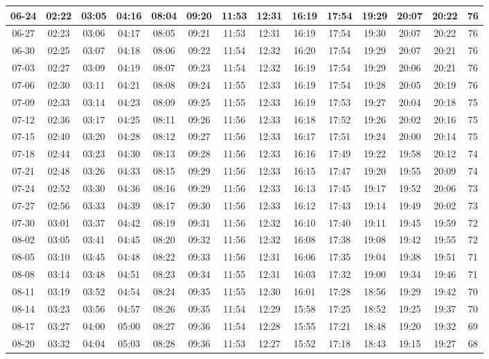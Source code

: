 \begin{footnotesize}
\begin{longtable}{c | c | c | c | c | c | c | c | c | c | c | c | c | c}
		06-24&02:22&03:05&04:16&08:04&09:20&11:53&12:31&16:19&17:54&19:29&20:07&20:22&76\\\hline
		06-27&02:23&03:06&04:17&08:05&09:21&11:53&12:31&16:19&17:54&19:30&20:07&20:22&76\\\hline
		06-30&02:25&03:07&04:18&08:06&09:22&11:54&12:32&16:20&17:54&19:29&20:07&20:21&76\\\hline
		07-03&02:27&03:09&04:19&08:07&09:23&11:54&12:32&16:19&17:54&19:29&20:06&20:21&76\\\hline
		07-06&02:30&03:11&04:21&08:08&09:24&11:55&12:33&16:19&17:54&19:28&20:05&20:19&76\\\hline
		07-09&02:33&03:14&04:23&08:09&09:25&11:55&12:33&16:19&17:53&19:27&20:04&20:18&75\\\hline
		07-12&02:36&03:17&04:25&08:11&09:26&11:56&12:33&16:18&17:52&19:26&20:02&20:16&75\\\hline
		07-15&02:40&03:20&04:28&08:12&09:27&11:56&12:33&16:17&17:51&19:24&20:00&20:14&75\\\hline
		07-18&02:44&03:23&04:30&08:13&09:28&11:56&12:33&16:16&17:49&19:22&19:58&20:12&74\\\hline
		07-21&02:48&03:26&04:33&08:15&09:29&11:56&12:33&16:15&17:47&19:20&19:55&20:09&74\\\hline
		07-24&02:52&03:30&04:36&08:16&09:29&11:56&12:33&16:13&17:45&19:17&19:52&20:06&73\\\hline
		07-27&02:56&03:33&04:39&08:17&09:30&11:56&12:33&16:12&17:43&19:14&19:49&20:02&73\\\hline
		07-30&03:01&03:37&04:42&08:19&09:31&11:56&12:32&16:10&17:40&19:11&19:45&19:59&72\\\hline
		08-02&03:05&03:41&04:45&08:20&09:32&11:56&12:32&16:08&17:38&19:08&19:42&19:55&72\\\hline
		08-05&03:10&03:45&04:48&08:22&09:33&11:56&12:31&16:06&17:35&19:04&19:38&19:51&71\\\hline
		08-08&03:14&03:48&04:51&08:23&09:34&11:55&12:31&16:03&17:32&19:00&19:34&19:46&71\\\hline
		08-11&03:19&03:52&04:54&08:24&09:35&11:55&12:30&16:01&17:28&18:56&19:29&19:42&70\\\hline
		08-14&03:23&03:56&04:57&08:26&09:35&11:54&12:29&15:58&17:25&18:52&19:25&19:37&70\\\hline
		08-17&03:27&04:00&05:00&08:27&09:36&11:54&12:28&15:55&17:21&18:48&19:20&19:32&69\\\hline
		08-20&03:32&04:04&05:03&08:28&09:36&11:53&12:27&15:52&17:18&18:43&19:15&19:27&68\\\hline

\end{longtable}
\end{footnotesize}
